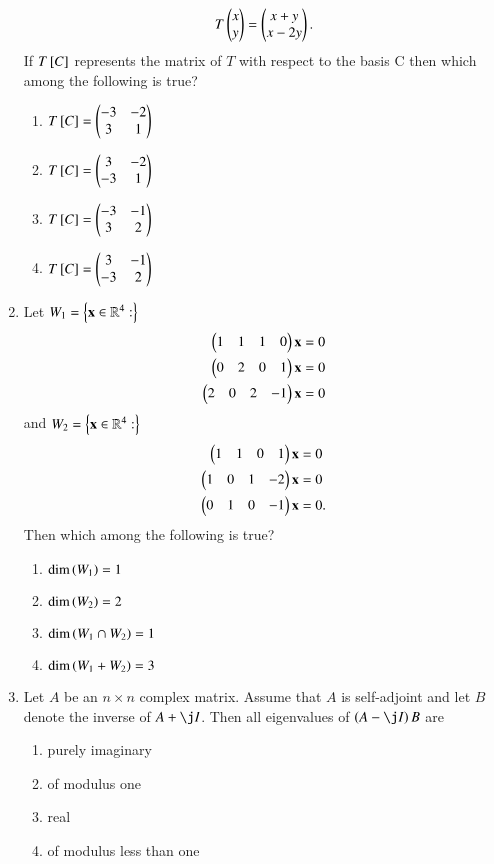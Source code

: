 \begin{enumerate}[label=\thesection.\arabic*.,ref=\thesection.\theenumi]
\begin{align}
T\begin{pmatrix}x\\y\end{pmatrix} = \begin{pmatrix}x+y \\ x-2y\end{pmatrix}.
\end{align}
If $T{}\left[C\right]$ represents the matrix of $T$ with respect to the basis C then
which among the following is true?
\begin{enumerate}
\item $T{}\left[C\right] = \begin{pmatrix}-3 & -2\\3 & 1\end{pmatrix}$
\item $T{}\left[C\right] = \begin{pmatrix}3 & -2\\-3 & 1\end{pmatrix}$
\item $T{}\left[C\right] = \begin{pmatrix}-3 & -1\\3 & 2\end{pmatrix}$
\item $T{}\left[C\right] = \begin{pmatrix}3 & -1\\-3 & 2\end{pmatrix}$
\end{enumerate}
\item Let $W_1 = \left\{\mathbf{x} \in \mathbb{R}^4:\right\}$
\begin{align}
 \begin{pmatrix}1 & 1 & 1 & 0\end{pmatrix}\mathbf{x} = 0
\\
 \begin{pmatrix}0 & 2 & 0 & 1\end{pmatrix}\mathbf{x} = 0
\\
 \begin{pmatrix}2 & 0 & 2 & -1\end{pmatrix}\mathbf{x} = 0
\end{align}
and
$W_2 = \left\{\mathbf{x} \in \mathbb{R}^4:\right\}$
\begin{align}
 \begin{pmatrix}1 & 1 & 0 & 1\end{pmatrix}\mathbf{x} &= 0
\\
 \begin{pmatrix}1 & 0 & 1 & -2\end{pmatrix}\mathbf{x} &= 0
\\
 \begin{pmatrix}0 & 1 & 0 & -1\end{pmatrix}\mathbf{x} &= 0.
\end{align}
Then which among the following is true?
\begin{enumerate}
\item $\text{dim}\left(W_1\right) = 1$
\item $\text{dim}\left(W_2\right) = 2$
\item $\text{dim}\left(W_1 \cap W_2\right) = 1$
\item $\text{dim}\left(W_1+W_2\right) = 3$
\end{enumerate}
%
\item Let $A$ be an $n \times n$ complex matrix.  Assume that $A$ is self-adjoint and let $B$ denote the inverse of $A + \j I$. Then all eigenvalues of $\brak{A-\j I}B$ are 
\begin{enumerate}
\item purely imaginary
\item of modulus one
\item real
\item of modulus less than one

\end{enumerate}
\end{enumerate}
